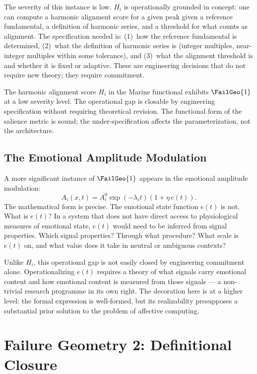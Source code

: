 The severity of this instance is low. $H_i$ is operationally
grounded in concept: one can compute a harmonic alignment
score for a given peak given a reference fundamental,
a definition of harmonic series, and a threshold for
what counts as alignment. The specification needed is:
(1)~how the reference fundamental is determined, (2)~what
the definition of harmonic series is (integer multiples,
near-integer multiples within some tolerance), and (3)~what
the alignment threshold is and whether it is fixed or
adaptive. These are engineering decisions that do not
require new theory; they require commitment.

\begin{auditprop}
\label{ap:fg1-hcf}
The harmonic alignment score $H_i$ in the Marine functional
exhibits $\FailGeo{1}$ at a low severity level. The
operational gap is closable by engineering specification
without requiring theoretical revision. The functional
form of the salience metric is sound; the under-specification
affects the parameterization, not the architecture.
\end{auditprop}

\subsection{The Emotional Amplitude Modulation}

A more significant instance of $\FailGeo{1}$ appears in
the \MEMeight{} emotional amplitude modulation:
\[
  A_i(x,t) = A_i^0 \exp(-\lambda_i t)(1 + \eta\, e(t)).
\]
The mathematical form is precise. The emotional state
function $e(t)$ is not. What is $e(t)$? In a system
that does not have direct access to physiological
measures of emotional state, $e(t)$ would need to be
inferred from signal properties. Which signal properties?
Through what procedure? What scale is $e(t)$ on, and
what value does it take in neutral or ambiguous contexts?

Unlike $H_i$, this operational gap is not easily closed
by engineering commitment alone. Operationalizing $e(t)$
requires a theory of what signals carry emotional content
and how emotional content is measured from those signals
--- a non-trivial research programme in its own right.
The decoration here is at a higher level: the formal
expression is well-formed, but its realizability
presupposes a substantial prior solution to the problem
of affective computing.

\section{Failure Geometry 2: Definitional Closure}
\label{sec:fg2-analysis}

